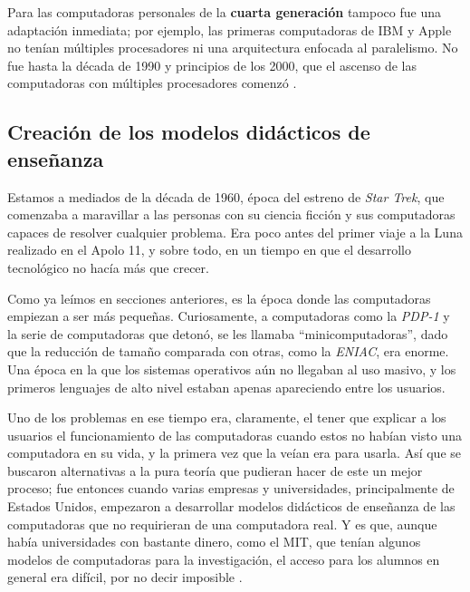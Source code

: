 \documentclass[letterpaper,12pt,oneside]{book}
\begin{document}
		Para las computadoras personales de la \textbf{cuarta generación} tampoco fue una adaptación inmediata; por ejemplo, las primeras computadoras de IBM y Apple no tenían
		múltiples procesadores ni una arquitectura enfocada al paralelismo. No fue hasta la década de 1990 y principios de los 2000, que el ascenso de las computadoras con múltiples procesadores comenzó \cite{tanenbaum_modern_2002}.

		
		
		\clearpage		
		\subsection{Creación de los modelos didácticos de enseñanza}
		
		Estamos a mediados de la década de 1960, época del estreno de \textit{Star Trek}, que comenzaba a maravillar a las personas con su ciencia ficción  y sus
		computadoras capaces de resolver cualquier problema. Era poco antes del primer viaje a la Luna realizado en el Apolo 11, y sobre todo,
		en un tiempo en que el desarrollo tecnológico no hacía más que crecer.
  
        Como ya leímos en secciones
		anteriores,
		es la época donde las computadoras empiezan a ser más pequeñas. Curiosamente, a computadoras como la \textit{PDP-1} y la serie de computadoras que detonó, se les llamaba
		``minicomputadoras'', dado que la reducción de tamaño comparada con otras, como la \textit{ENIAC}, era enorme. Una época en la que
		los sistemas operativos aún no llegaban al uso masivo, y los primeros lenguajes de alto nivel estaban apenas apareciendo entre los usuarios. 
  
        Uno de los 
		problemas en ese tiempo era, claramente, el tener que explicar
		a los usuarios el funcionamiento de las computadoras cuando estos no habían visto una computadora en su vida, y la primera vez que la veían era para usarla. Así que se buscaron alternativas a la pura teoría que pudieran hacer de este un mejor proceso; fue entonces cuando varias empresas 
		y universidades, principalmente de Estados Unidos, empezaron a desarrollar modelos didácticos de enseñanza de las computadoras que no requirieran de una computadora 
		real. Y es que, aunque había universidades con bastante dinero, como el MIT, que tenían algunos modelos de computadoras para la investigación, 
		el acceso para los alumnos en general era difícil, por no decir imposible \cite[p. 71]{ceruzzi_computing_2012}.
        
\end{document}
